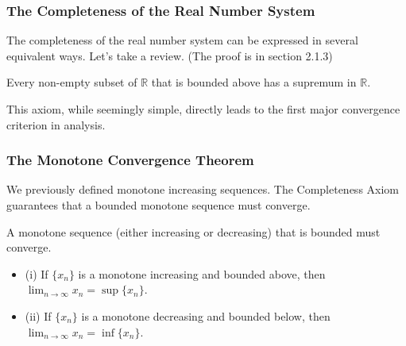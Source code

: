 \documentclass[oneside]{book}
\begin{document}
\subsubsection{The Completeness of the Real Number System}

The completeness of the real number system can be expressed in several equivalent ways. Let's take a review. (The proof is in section 2.1.3)

\begin{theorem}
\label{thm:completeness_en}
Every non-empty subset of $\mathbb{R}$ that is bounded above has a supremum in $\mathbb{R}$.
\end{theorem}

This axiom, while seemingly simple, directly leads to the first major convergence criterion in analysis.

\subsubsection{The Monotone Convergence Theorem}

We previously defined monotone increasing sequences. The Completeness Axiom guarantees that a bounded monotone sequence must converge.

\begin{theorem}
\label{thm:mct_en}
A monotone sequence (either increasing or decreasing) that is bounded must converge.
\begin{itemize}
    \item (i) If $\{x_n\}$ is a monotone increasing and bounded above, then $\lim_{n \to \infty} x_n = \sup \{x_n\}$.
    \item (ii) If $\{x_n\}$ is a monotone decreasing and bounded below, then $\lim_{n \to \infty} x_n = \inf \{x_n\}$.
\end{itemize}
\end{theorem}
\end{document}
